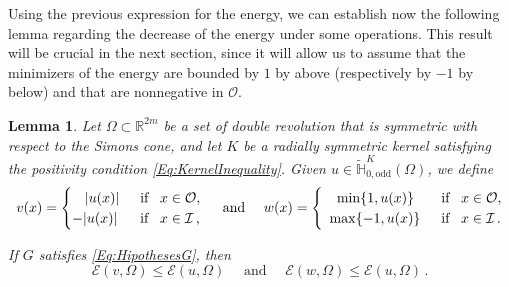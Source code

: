 \documentclass[12pt,reqno]{amsart}
\newtheorem{lemma}[theorem]{Lemma}
\theoremstyle{definition}
\theoremstyle{remark}
\newcommand{\con}[1]{\mathbb{#1}}
\newcommand{\R}{\con{R}} %
\renewcommand{\H}{\con{H}}
\newcommand{\ecal}{\mathcal{E}}
\newcommand{\ical}{\mathcal{I}}
\newcommand{\ocal}{\mathcal{O}}
\numberwithin{equation}{section}
\begin{document}
Using the previous expression for the energy, we can establish now the following lemma regarding the decrease of the energy under some operations. This result will be crucial in the next section, since it will allow us to assume that the minimizers of the energy are bounded by $1$ by above (respectively by $-1$ by below) and that are nonnegative in $\ocal$.
\begin{lemma}
	\label{Lemma:DecreaseEnergy} 
	Let $\Omega\subset \R^{2m}$ be a set of double revolution that is symmetric with respect to the Simons cone, and let $K$ be a radially symmetric kernel satisfying the positivity condition \eqref{Eq:KernelInequality}. Given $u\in\widetilde{\H}^K_{0,\mathrm{odd}}(\Omega)$, we define
	\begin{equation*}
	v(x) = \begin{cases}
	\hspace{3.2mm}|u(x)| \,\,\, &\text{if } \,\,\, x\in\ocal,\\
	-|u(x)| \,\,\, &\text{if } \,\,\, x\in\ical\, ,
	\end{cases}
	\quad 
	\text{ and }
	\quad
	w(x) = \begin{cases}
	\hspace{3.6mm}\min\{1,u(x)\} \,\,\, &\text{if } \,\,\, x\in\ocal,\\
	\,\,\,\max\{-1,u(x)\} \,\,\, &\text{if } \,\,\, x\in\ical\,.
	\end{cases}
	\end{equation*}
	
	If $G$ satisfies \eqref{Eq:HipothesesG}, then
	$$ \ecal(v,\Omega) \leq \ecal(u,\Omega) \quad 
	\text{ and }
	\quad \ecal(w,\Omega) \leq \ecal(u,\Omega) \,.  $$
\end{lemma}
\end{document}

